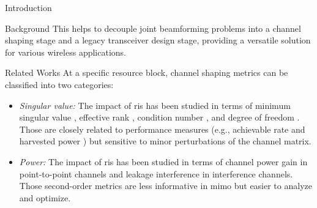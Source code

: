 \begin{section}{Introduction}
\begin{subsection}{Background}
		This helps to decouple joint beamforming problems into a channel shaping stage and a legacy transceiver design stage, providing a versatile solution for various wireless applications.
	\end{subsection}

	\begin{subsection}{Related Works}
		At a specific resource block, channel shaping metrics can be classified into two categories:
		\begin{itemize}
			\item \emph{Singular value:} The impact of \gls{ris} has been studied in terms of minimum singular value \cite{ElMossallamy2021}, effective rank \cite{ElMossallamy2021,Meng2023}, condition number \cite{Zheng2022,Huang2023}, and degree of freedom \cite{Bafghi2022,Zheng2023,Chae2023}. Those are closely related to performance measures (e.g., achievable rate and harvested power \cite{Shen2021}) but sensitive to minor perturbations of the channel matrix.
			\item \emph{Power:} The impact of \gls{ris} has been studied in terms of channel power gain \cite{Wu2019,Shen2020a,Nerini2023,Nerini2024,Santamaria2023} in point-to-point channels and leakage interference \cite{Santamaria2023a} in interference channels. Those second-order metrics are less informative in \gls{mimo} but easier to analyze and optimize.
		\end{itemize}


\end{subsection}
\end{section}
